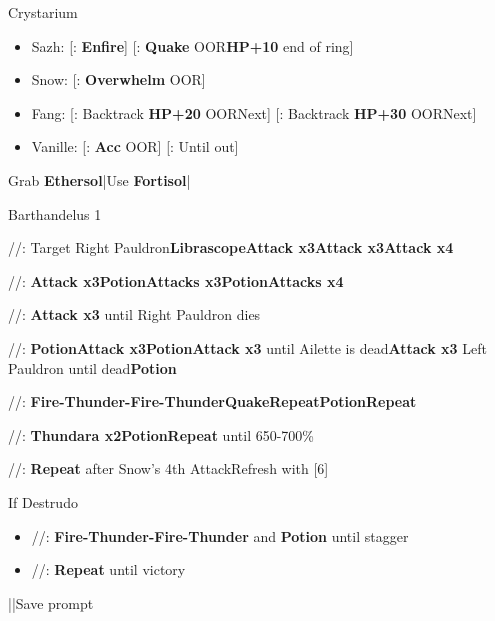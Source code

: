 \begin{menu}
	\item Crystarium
	\begin{itemize}
		\item Sazh: [\syn: \textbf{Enfire}] [\com: \textbf{Quake} OOR\to \textbf{HP+10} end of ring]
		\item Snow: [\rav: \textbf{Overwhelm} OOR]
		\item Fang: [\com: Backtrack \textbf{HP+20} OOR\to Next] [\sab: Backtrack \textbf{HP+30} OOR\to Next]
		\item Vanille: [\sab: \textbf{Acc} OOR] [\med: Until out]
	\end{itemize}
\end{menu}
\begin{mainlist}
	\item Grab \textbf{Ethersol}|Use \textbf{Fortisol}|\skip
\end{mainlist}
\begin{fight}{Barthandelus 1}
	\item [1] \com/\syn/\com: Target Right Pauldron\to \textbf{Librascope}\to \textbf{Attack x3}\to \textbf{Attack x3}\to \textbf{Attack x4}
	\item [6] \com/\com/\com: \textbf{Attack x3}\to \textbf{Potion}\to \textbf{Attacks x3}\to \textbf{Potion}\to \textbf{Attacks x4}
	\item [5] \com/\com/\com: \textbf{Attack x3} until Right Pauldron dies
	\item [1] \com/\syn/\com: \textbf{Potion}\to \textbf{Attack x3}\to \textbf{Potion}\to \textbf{Attack x3} until Ailette is dead\to \textbf{Attack x3} Left Pauldron until dead\to \textbf{Potion}
	\item [2] \rav/\rav/\rav: \textbf{Fire-Thunder-Fire-Thunder}\to \textbf{Quake}\to \textbf{Repeat}\to \textbf{Potion}\to \textbf{Repeat}
	\item [4] \rav/\rav/\rav: \textbf{Thundara x2}\to \textbf{Potion}\to \textbf{Repeat} until 650-700\%
	\item [5] \com/\com/\com: \textbf{Repeat} after Snow's 4th Attack\to Refresh with [6]
	\item If Destrudo
	\begin{itemize}
		\item [4] \rav/\rav/\rav: \textbf{Fire-Thunder-Fire-Thunder} and \textbf{Potion} until stagger
		\item [5] \com/\com/\com: \textbf{Repeat} until victory
	\end{itemize}
	\item ||Save prompt
\end{fight}
